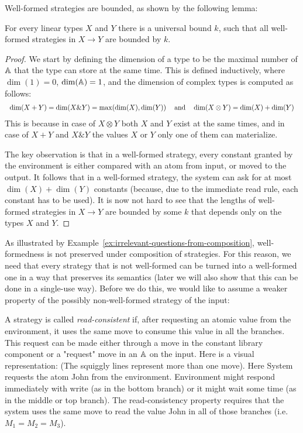 \noindent
Well-formed strategies are bounded, as shown by the following lemma:
\begin{lemma}\label{lem:well-formed-bounded}
    For every linear types $X$ and $Y$ there is a universal bound $k$, such that all well-formed strategies in $X \to Y$ are bounded by $k$. 
\end{lemma}
\begin{proof}
    We start by defining the dimension of a type to be the maximal number of $\mathbb A$ that the type can store at the same time. This is defined inductively, 
    where $\dim(1) = 0$, $\dim(\mathbb A) = 1$, and the dimension of complex types is computed as follows:
    \[ \begin{tabular}{ccc}
        $\dim(X + Y) = \dim(X \& Y) = \max(\dim(X), \dim(Y))$ & and & $\dim(X \otimes Y) = \dim(X) + \dim(Y)$
    \end{tabular}
    \]
    This is because in case of $X \otimes Y$ both $X$ and $Y$ exist at the same times, and in case of $X + Y$ and $X \& Y$ the values $X$ or $Y$
    only one of them can materialize. 

    The key observation is that in a well-formed strategy, every constant granted by the environment is either compared with an atom from input, 
    or moved to the output. It follows that in a well-formed strategy, the system can ask for at most $\dim(X) + \dim(Y)$ constants
    (because, due to the immediate read rule, each constant has to be used). It is now not hard to see that the lengths of well-formed strategies 
    in $X \to Y$ are bounded by some $k$ that depends only on the types $X$ and $Y$.
\end{proof}

As illustrated by Example~\ref{ex:irrelevant-questions-from-composition}, well-formedness is not preserved under composition of strategies. 
For this reason, we need that every  strategy that is not well-formed  can be turned into a well-formed one in a way that preserves its semantics (later we will also 
show that this can be done in a single-use way). Before we do this, we would like to assume a weaker property of the possibly non-well-formed strategy 
of the input:
\begin{definition}
    A strategy is called \emph{read-consistent} if, after requesting an atomic value from the environment, it uses the same move 
    to consume this value in all the branches. This request can be made either through a move in the constant
    library component or a "request" move in an $\mathbb A$ on the input. Here is a visual representation:
    (The squiggly lines represent more than one move). Here System requests the atom John from the environment. 
    Environment might respond immediately with write (as in the bottom branch) or it might wait some time 
    (as in the middle or top branch). The read-consistency property requires that the system uses the same move to read 
    the value John in all of those branches (i.e. $M_1 = M_2 = M_3$). 
\end{definition}

